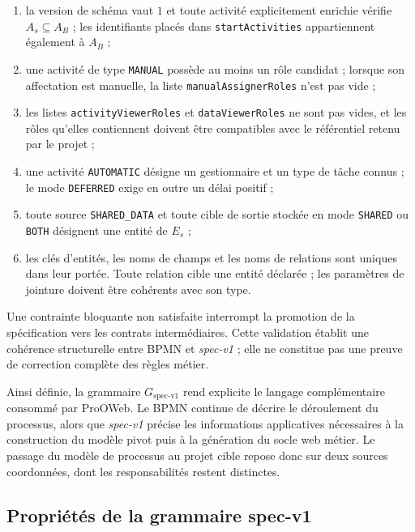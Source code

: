 \begin{enumerate}
    \item la version de schéma vaut $1$ et toute activité explicitement enrichie
    vérifie $A_s\subseteq A_B$ ; les identifiants placés dans
    \texttt{startActivities} appartiennent également à $A_B$ ;
    \item une activité de type \texttt{MANUAL} possède au moins un rôle candidat ;
    lorsque son affectation est manuelle, la liste
    \texttt{manualAssignerRoles} n'est pas vide ;
    \item les listes \texttt{activityViewerRoles} et
    \texttt{dataViewerRoles} ne sont pas vides, et les rôles qu'elles contiennent
    doivent être compatibles avec le référentiel retenu par le projet ;
    \item une activité \texttt{AUTOMATIC} désigne un gestionnaire et un type de
    tâche connus ; le mode \texttt{DEFERRED} exige en outre un délai positif ;
    \item toute source \texttt{SHARED\_DATA} et toute cible de sortie stockée en
    mode \texttt{SHARED} ou \texttt{BOTH} désignent une entité de $E_s$ ;
    \item les clés d'entités, les noms de champs et les noms de relations sont
    uniques dans leur portée. Toute relation cible une entité déclarée ; les
    paramètres de jointure doivent être cohérents avec son type.
\end{enumerate}

Une contrainte bloquante non satisfaite interrompt la promotion de la
spécification vers les contrats intermédiaires. Cette validation établit une
cohérence structurelle entre BPMN et \textit{spec-v1} ; elle ne constitue pas une
preuve de correction complète des règles métier.

Ainsi définie, la grammaire $G_{\text{spec-v1}}$ rend explicite le langage
complémentaire consommé par ProOWeb. Le BPMN continue de décrire le déroulement
du processus, alors que \textit{spec-v1} précise les informations applicatives
nécessaires à la construction du modèle pivot puis à la génération du socle web
métier. Le passage du modèle de processus au projet cible repose donc sur deux
sources coordonnées, dont les responsabilités restent distinctes.

\subsection{Propriétés de la grammaire spec-v1}
\label{sec:chap3-proprietes-grammaire-specv1}

